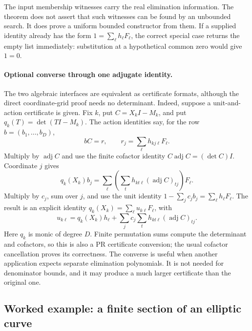 The input membership witnesses carry the real elimination information.
The theorem does not assert that such witnesses can be found by an
unbounded search.  It does prove a uniform bounded constructor from
them.  If a supplied identity already has the form
$1=\sum_\ell h_\ell F_\ell$, the correct special case returns the
empty list immediately: substitution at a hypothetical common zero
would give $1=0$.

\paragraph{Optional converse through one adjugate identity.}
The two algebraic interfaces are equivalent as certificate formats,
although the direct coordinate-grid proof needs no determinant.
Indeed, suppose a unit-and-action certificate is given.  Fix $k$,
put $C= X_k I-M_k$, and put $q_k(T)=\det(TI-M_k)$.
The action identities say, for the row $b=(b_1,\ldots,b_D)$,
\[
 bC=r,\qquad r_j=\sum_\ell h_{kj\ell}F_\ell.
\]
Multiply by $\operatorname{adj}C$ and use the finite cofactor
identity $C\operatorname{adj}C=(\det C)I$.  Coordinate $j$ gives
\[
 q_k(X_k)b_j
   =\sum_\ell
       \left(\sum_t h_{kt\ell}(\operatorname{adj}C)_{tj}\right)
       F_\ell.
\]
Multiply by $c_j$, sum over $j$, and use the unit identity
$1-\sum_jc_jb_j=\sum_\ell h_\ell F_\ell$.  The result is an
explicit identity $q_k(X_k)=\sum_\ell u_{k\ell}F_\ell$, with
\[
 u_{k\ell}
   =q_k(X_k)h_\ell+
     \sum_j c_j\sum_t h_{kt\ell}(\operatorname{adj}C)_{tj}.
\]
Here $q_k$ is monic of degree $D$.  Finite permutation sums compute
the determinant and cofactors, so this is also a PR certificate
conversion; the usual cofactor cancellation proves its correctness.
The converse is useful when another application expects separate
elimination polynomials.  It is not needed for denominator bounds,
and it may produce a much larger certificate than the original one.

\subsection{Worked example: a finite section of an elliptic curve}

